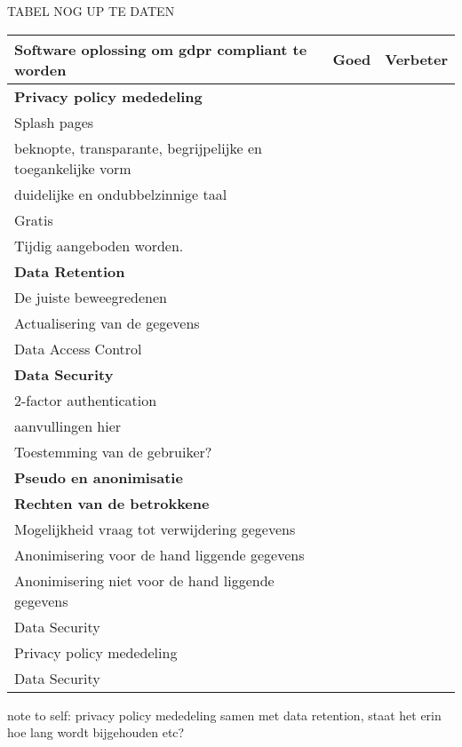 TABEL NOG UP TE DATEN 

	\begin{tabularx}{\linewidth}{ |X|l|l| } 
		\hline
		Software oplossing om gdpr compliant te worden & Goed & Verbeter  \\ [0.5ex]
		
		\hline\hline
		\textbf{Privacy policy mededeling} & \checkmark &  \\ 
		Splash pages  &  &  \\ 
		beknopte, transparante, begrijpelijke en toegankelijke vorm  &  &  \\ 
		duidelijke en ondubbelzinnige taal  &  &  \\ 
		Gratis  & \checkmark &  \\ 
		Tijdig aangeboden worden.  &  &  \\ 
		\textbf{Data Retention} &  & \checkmark \\ 
		De juiste beweegredenen &  &  \\
		Actualisering van de gegevens  &  &  \\
		\hline
		Data Access Control &  & \checkmark \\ 
		\hline
		\textbf{Data Security} &  &  \\
		2-factor authentication  & \checkmark &  \\ 
		aanvullingen hier & \checkmark &  \\ 
		\hline
		Toestemming van de gebruiker?  & \checkmark &  \\ 
		\hline
		\textbf{Pseudo en anonimisatie} &  &  \\ 
		\hline
		\textbf{Rechten van de betrokkene} &  &  \\ 
		Mogelijkheid vraag tot verwijdering gegevens & \checkmark &  \\ 
		Anonimisering voor de hand liggende gegevens & \checkmark &  \\
		Anonimisering niet voor de hand liggende gegevens & & \checkmark  \\
		Data Security &  &  \\ 
		
		Privacy policy mededeling & \checkmark &  \\ 
		
		Data Security &  &  \\ 
		\hline
		
	\end{tabularx}

note to self: privacy policy mededeling samen met data retention, staat het erin hoe lang wordt bijgehouden etc? 


